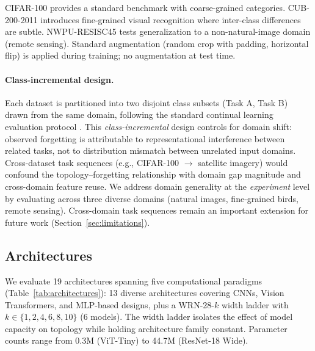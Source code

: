 \documentclass[10pt,twocolumn]{article}
\begin{document}
CIFAR-100 provides a standard benchmark with coarse-grained categories. CUB-200-2011 \citep{wah2011caltech} introduces fine-grained visual recognition where inter-class differences are subtle. NWPU-RESISC45 \citep{cheng2017remote} tests generalization to a non-natural-image domain (remote sensing). Standard augmentation (random crop with padding, horizontal flip) is applied during training; no augmentation at test time.

\paragraph{Class-incremental design.}
Each dataset is partitioned into two disjoint class subsets (Task A, Task B) drawn from the same domain, following the standard continual learning evaluation protocol \citep{kirkpatrick2017overcoming, zenke2017continual, rebuffi2017icarl}. This \emph{class-incremental} design controls for domain shift: observed forgetting is attributable to representational interference between related tasks, not to distribution mismatch between unrelated input domains. Cross-dataset task sequences (e.g., CIFAR-100 $\rightarrow$ satellite imagery) would confound the topology--forgetting relationship with domain gap magnitude and cross-domain feature reuse. We address domain generality at the \emph{experiment} level by evaluating across three diverse domains (natural images, fine-grained birds, remote sensing). Cross-domain task sequences remain an important extension for future work (Section~\ref{sec:limitations}).

\subsection{Architectures}

We evaluate 19 architectures spanning five computational paradigms (Table~\ref{tab:architectures}): 13 diverse architectures covering CNNs, Vision Transformers, and MLP-based designs, plus a WRN-28-$k$ width ladder with $k \in \{1, 2, 4, 6, 8, 10\}$ (6 models). The width ladder isolates the effect of model capacity on topology while holding architecture family constant. Parameter counts range from 0.3M (ViT-Tiny) to 44.7M (ResNet-18 Wide).
\end{document}
